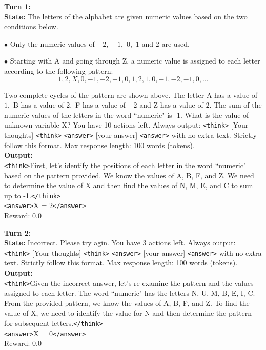 \begin{tcolorbox}[breakable, colback=gray!2, colframe=black, boxrule=0.5pt, arc=2pt, width=\linewidth, title=Box 4: Multi-Turn Rollout before training]
\label{box:case1}
\textbf{Turn 1:} \\
\textbf{State:}
The letters of the alphabet are given numeric values based on the two conditions below.

$\bullet$  Only the numeric values of $-2,$ $-1,$ $0,$ $1$ and $2$ are used.

$\bullet$  Starting with A and going through Z, a numeric value is assigned to each letter according to the following pattern: $$
1, 2, X, 0, -1, -2, -1, 0, 1, 2, 1, 0, -1, -2, -1, 0,\ldots
$$

Two complete cycles of the pattern are shown above. The letter A has a value of $1,$ B has a value of $2,$ F has a value of $-2$ and Z has a value of $2$. The sum of the numeric values of the letters in the word ``numeric" is -1. What is the value of unknown variable X?
You have 10 actions left. Always output: \texttt{<think>} [Your thoughts] \texttt{<think>} \texttt{<answer>} [your answer] \texttt{<answer>} with no extra text. Strictly follow this format. Max response length: 100 words (tokens). \\
\textbf{Output:} \\
\texttt{<think>}First, let's identify the positions of each letter in the word ``numeric" based on the pattern provided. We know the values of A, B, F, and Z. We need to determine the value of X and then find the values of N, M, E, and C to sum up to -1.\texttt{</think>} \\
\texttt{<answer>}X = 2\texttt{</answer>} \\
Reward: 0.0

\vspace{4pt}
\textbf{Turn 2:} \\
\textbf{State:}
Incorrect. Please try agin.
You have 3 actions left. Always output: \texttt{<think>} [Your thoughts] \texttt{<think>} \texttt{<answer>} [your answer] \texttt{<answer>} with no extra text. Strictly follow this format. Max response length: 100 words (tokens). \\
\textbf{Output:} \\
\texttt{<think>}Given the incorrect answer, let's re-examine the pattern and the values assigned to each letter. The word ``numeric" has the letters N, U, M, B, E, I, C. From the provided pattern, we know the values of A, B, F, and Z. To find the value of X, we need to identify the value for N and then determine the pattern for subsequent letters.\texttt{</think>} \\
\texttt{<answer>}X = 0\texttt{</answer>} \\
Reward: 0.0


\end{tcolorbox}
